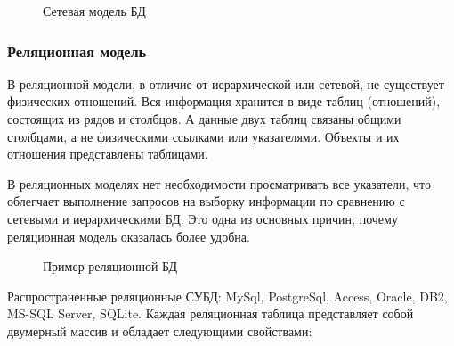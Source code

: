 \documentclass[a4paper, 14pt]{article}
\begin{document}
	\begin{figure}[h]
		\caption{Сетевая модель БД}
		\label{fig:image}
	\end{figure}
	
	\subsubsection{Реляционная модель}
	
	В реляционной модели, в отличие от иерархической или сетевой, не существует физических отношений. Вся информация хранится в виде таблиц (отношений), состоящих из рядов и столбцов. А данные двух таблиц связаны общими столбцами, а не физическими ссылками или указателями. Объекты и их отношения представлены таблицами.
	
	В реляционных моделях нет необходимости просматривать все указатели, что облегчает выполнение запросов на выборку информации по сравнению с сетевыми и иерархическими БД. Это одна из основных причин, почему реляционная модель оказалась более удобна.
	
	\begin{figure}[h]
	\caption{Пример реляционной БД}
	\label{fig:image}
	\end{figure}
	
	Распространенные реляционные СУБД: MySql, PostgreSql, Access, Oracle, DB2, MS-SQL Server, SQLite.
	Каждая реляционная таблица представляет собой двумерный массив и обладает следующими свойствами:
	
\end{document}
